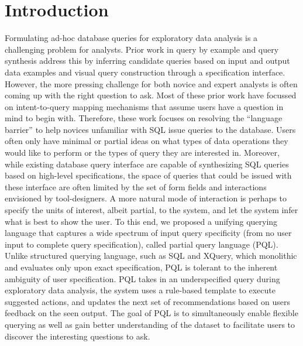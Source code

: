 \documentclass{sig-alternate-05-2015}
\begin{document}
\section{Introduction}
Formulating ad-hoc database queries for exploratory data analysis is a challenging problem for analysts. Prior work in query by example and query synthesis address this by inferring candidate queries based on input and output data examples and visual query construction through a specification interface.  However, the more pressing challenge for both novice and expert analysts is often coming up with the right question to ask. Most of these prior work have focussed on intent-to-query mapping mechanisms that assume users have a question in mind to begin with. Therefore, these work focuses on resolving the “language barrier” to help novices unfamiliar with SQL issue queries to the database. Users often only have minimal or partial ideas on what types of data operations they would like to perform or the types of query they are interested in.  Moreover, while existing database query interface are capable of synthesizing SQL queries based on high-level specifications, the space of queries that could be issued with these interface are often limited by the set of form fields and interactions envisioned by tool-designers. A more natural mode of interaction is perhaps to specify the units of interest, albeit partial, to the system, and let the system infer what is best to show the user.
To this end, we proposed a unifying querying language that captures a wide spectrum of input query specificity (from no user input to complete query specification), called partial query language (PQL). Unlike structured querying language, such as SQL and XQuery, which monolithic and evaluates only upon exact specification, PQL is tolerant to the inherent ambiguity of user specification. PQL takes in an underspecified query during exploratory data analysis, the system uses a rule-based template to execute suggested actions, and updates the next set of recommendations based on users feedback on the seen output. The goal of PQL is to simultaneously enable flexible querying as well as gain better understanding of the dataset to facilitate users to discover the interesting questions to ask.

\end{document}
